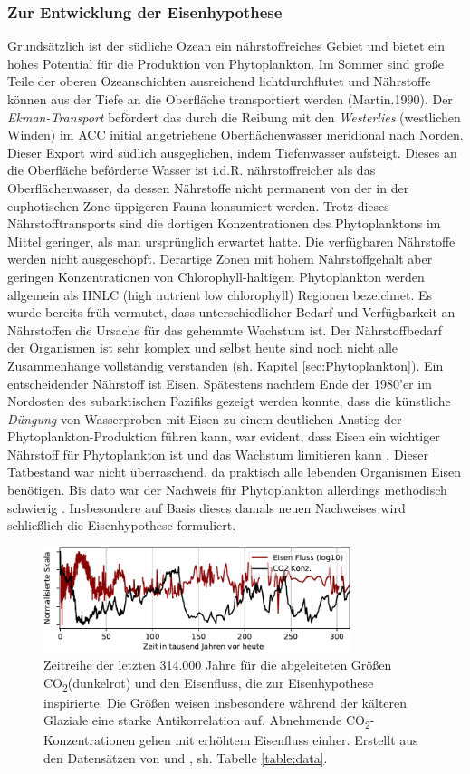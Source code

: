 \documentclass[12pt,a4paper,onecolumn,headheight=30pt]{scrartcl}
\newcommand{\cotwo}{CO\textsubscript{2}}
\begin{document}
\subsubsection{Zur Entwicklung der Eisenhypothese}
Grundsätzlich ist der südliche Ozean ein nährstoffreiches Gebiet und
bietet ein hohes Potential für die Produktion von Phytoplankton. Im Sommer sind große Teile der oberen Ozeanschichten ausreichend lichtdurchflutet und Nährstoffe können aus der Tiefe an die Oberfläche transportiert werden (Martin.1990). Der \textit{Ekman-Transport} befördert das durch die Reibung mit den \textit{Westerlies} (westlichen Winden) im ACC initial angetriebene Oberflächenwasser meridional nach Norden. Dieser Export wird südlich ausgeglichen, indem Tiefenwasser aufsteigt. Dieses an die Oberfläche beförderte Wasser ist i.d.R. nährstoffreicher als das Oberflächenwasser, da dessen Nährstoffe nicht permanent von der in der euphotischen Zone üppigeren Fauna konsumiert werden. Trotz dieses Nährstofftransports sind die dortigen Konzentrationen des Phytoplanktons im Mittel geringer, als man ursprünglich erwartet hatte. Die verfügbaren Nährstoffe werden nicht ausgeschöpft. Derartige Zonen mit hohem Nährstoffgehalt aber geringen Konzentrationen von Chlorophyll-haltigem Phytoplankton werden allgemein als HNLC (high nutrient low chlorophyll) Regionen bezeichnet. Es wurde bereits früh vermutet, dass unterschiedlicher Bedarf und Verfügbarkeit an Nährstoffen die Ursache für das gehemmte Wachstum ist. Der Nährstoffbedarf der Organismen ist sehr komplex und selbst heute sind noch nicht alle Zusammenhänge vollständig verstanden (sh. Kapitel \ref{sec:Phytoplankton}). Ein entscheidender Nährstoff ist Eisen. Spätestens nachdem Ende der 1980'er im Nordosten des subarktischen Pazifiks gezeigt werden konnte, dass die künstliche \textit{Düngung} von Wasserproben mit Eisen zu einem deutlichen Anstieg der Phytoplankton-Produktion führen kann, war evident, dass Eisen ein wichtiger Nährstoff für Phytoplankton ist und das Wachstum limitieren kann \citep{Martin.1988}. Dieser Tatbestand war nicht überraschend, da praktisch alle lebenden Organismen Eisen benötigen. Bis dato war der Nachweis für Phytoplankton allerdings methodisch schwierig \citep{Martin.1988}. Insbesondere auf Basis dieses damals neuen Nachweises wird schließlich die Eisenhypothese formuliert.
\begin{figure}[htbp]
\centering
\includegraphics[width=0.8\textwidth]{bilder/co2_iron.pdf}
\caption{ Zeitreihe der letzten 314.000 Jahre für die abgeleiteten Größen \cotwo (dunkelrot) und den Eisenfluss, die zur Eisenhypothese inspirierte. Die Größen weisen insbesondere während der kälteren Glaziale eine starke Antikorrelation auf. Abnehmende \cotwo -Konzentrationen gehen mit erhöhtem Eisenfluss einher. Erstellt aus den Datensätzen von \cite{Bereiter.2015} und \cite{Vallelonga.2013}, sh. Tabelle \ref{table:data}.}   \label{fig:co2iron}
\end{figure}
\end{document}
